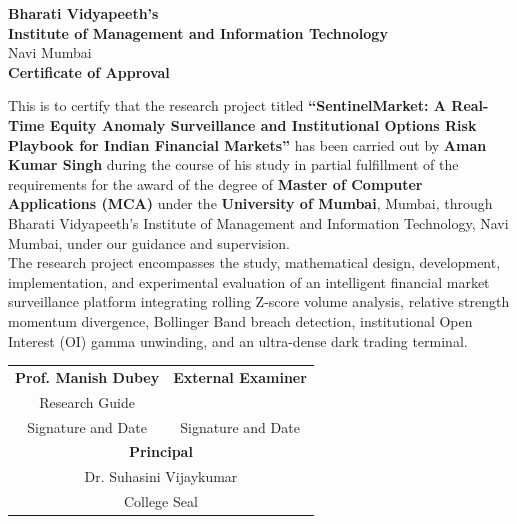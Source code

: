 \begin{center}
{\large \textbf{Bharati Vidyapeeth's}}\\[0.15cm]
{\large \textbf{Institute of Management and Information Technology}}\\[0.15cm]
{\normalsize Navi Mumbai}\\[1.5cm]

{\LARGE \textbf{Certificate of Approval}}\\[1.5cm]
\end{center}

\noindent This is to certify that the research project titled \textbf{``SentinelMarket: A Real-Time Equity Anomaly Surveillance and Institutional Options Risk Playbook for Indian Financial Markets''} has been carried out by \textbf{Aman Kumar Singh} during the course of his study in partial fulfillment of the requirements for the award of the degree of \textbf{Master of Computer Applications (MCA)} under the \textbf{University of Mumbai}, Mumbai, through Bharati Vidyapeeth's Institute of Management and Information Technology, Navi Mumbai, under our guidance and supervision.\\[0.6cm]

\noindent The research project encompasses the study, mathematical design, development, implementation, and experimental evaluation of an intelligent financial market surveillance platform integrating rolling Z-score volume analysis, relative strength momentum divergence, Bollinger Band breach detection, institutional Open Interest (OI) gamma unwinding, and an ultra-dense dark trading terminal.\\[2.5cm]

\noindent
\begin{tabular*}{\textwidth}{@{\extracolsep{\fill}}cc}
\textbf{Prof. Manish Dubey} & \textbf{External Examiner} \\[0.2cm]
Research Guide & \\[1.2cm]
Signature and Date & Signature and Date \\[2.5cm]
\multicolumn{2}{c}{\textbf{Principal}} \\[0.2cm]
\multicolumn{2}{c}{Dr. Suhasini Vijaykumar} \\[1.2cm]
\multicolumn{2}{c}{College Seal} \\
\end{tabular*}

\newpage
